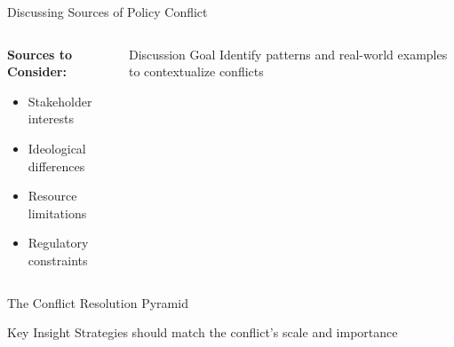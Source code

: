 \documentclass[10pt]{beamer}
\begin{document}
\begin{frame}{Discussing Sources of Policy Conflict}
    \begin{columns}[T]
        \begin{column}{0.5\textwidth}
            \textbf{Sources to Consider:}
            \begin{itemize}
                \item Stakeholder interests 
                \item Ideological differences 
                \item Resource limitations 
                \item Regulatory constraints 
            \end{itemize}
        \end{column}
        \begin{column}{0.5\textwidth}
            \begin{block}{Discussion Goal}
                Identify patterns and real-world examples to contextualize conflicts
            \end{block}
        \end{column}
    \end{columns}
\end{frame}

\begin{frame}{The Conflict Resolution Pyramid}
    \begin{center}
    \end{center}
    
    \begin{block}{Key Insight}
        Strategies should match the conflict's scale and importance
    \end{block}
\end{frame}
\end{document}
